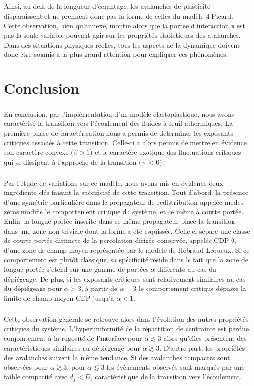 \subparagraph{}Ainsi, au-delà de la longueur d'écrantage, les avalanches de plasticité disparaissent et ne prennent donc pas la forme de celles du modèle 4-Picard. Cette observation, bien qu'annexe, montre alors que la portée d'interaction n'est pas la seule variable pouvant agir sur les propriétés statistiques des avalanches. Dans des situations physiques réelles, tous les aspects de la dynamique doivent donc être soumis à la plus grand attention pour expliquer ces phénomènes.

\section{Conclusion}

\subparagraph{}En conclusion, par l'implémentation d'un modèle élastoplastique, nous avons caractérisé la transition vers l'écoulement des fluides à seuil athermiques. La première phase de caractérisation nous a permis de déterminer les exposants critiques associés à cette transition. Celle-ci a alors permis de mettre en évidence son caractère convexe ($\beta >1$) et le caractère exotique des fluctuations critiques qui se dissipent à l'approche de la transition ($\gamma^\prime<0$). 

\subparagraph{}Par l'étude de variations sur ce modèle, nous avons mis en évidence deux ingrédients clés faisant la spécificité de cette transition. Tout d'abord, la présence d'une symétrie particulière dans le propagateur de redistribution appelée modes zéros modifie le comportement critique du système, et ce même à courte portée. Enfin, la longue portée inscrite dans ce même propagateur place la transition dans une zone non triviale dont la forme a été esquissée. Celle-ci sépare une classe de courte portée distincte de la percolation dirigée conservée, appelée CDP-0, d'une zone de champ moyen représentée par le modèle de Hébraud-Lequeux. Si ce comportement est plutôt classique, sa spécificité réside dans le fait que la zone de longue portée s'étend sur une gamme de portées $\alpha$ différente du cas du dépiégeage. De plus, si les exposants critiques sont relativement similaires au cas du dépiégeage pour $\alpha>3$, à partir de $\alpha=3$ le comportement critique dépasse la limite de champ moyen CDP jusqu'à $\alpha<1$.

\subparagraph{}Cette observation générale se retrouve alors dans l'évolution des autres propriétés critiques du système. L'hyperuniformité de la répartition de contrainte est perdue conjointement à la rugosité de l'interface pour $\alpha\lesssim 3$ alors qu'elles présentent des caractéristiques similaires au dépiégeage pour $\alpha\gtrsim 3$. D'autre part, les propriétés des avalanches suivent la même tendance. Si des avalanches compactes sont observées pour $\alpha\gtrsim 3$, pour $\alpha\lesssim 3$ les évènements observés sont marqués par une faible compacité avec $d_f < D$, caractéristique de la transition vers l'écoulement. 
